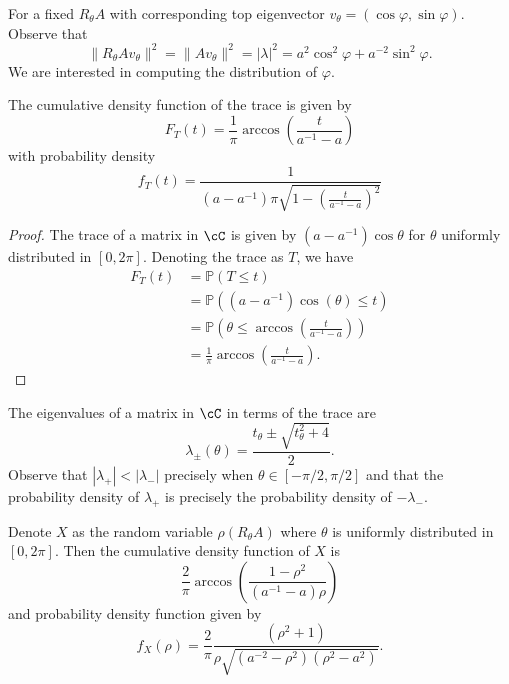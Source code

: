 \documentclass[10pt]{amsart}
\numberwithin{equation}{section}     %
\renewcommand{\P}{\mathbb{P}}
\begin{document}
For a fixed $R_\theta A$ with corresponding top eigenvector $v_\theta =(\cos \varphi, \sin \varphi) $. Observe that $$\|R_\theta A v_\theta\|^2 = \|Av_\theta\|^2= |\lambda|^2 = a^2 \cos^2 \varphi + a^{-2} \sin^2 \varphi. $$  We are interested in computing the distribution of $\varphi$. 

\begin{lemma}
    The cumulative density function of the trace is given by $$F_T(t) =  \frac{1}{\pi } \arccos\left( \frac{t}{a^{-1}-a}\right)$$ with probability density $$f_T(t) =  \frac{1}{(a-a^{-1})\pi\sqrt{1 - \left(\frac{t}{a^{-1}-a}\right)^2}}$$
\end{lemma}

\begin{proof}
    The trace of a matrix in $\cC$ is given by $(a - a^{-1}) \cos \theta$ for $\theta$ uniformly distributed in $[0,2\pi]$. Denoting the trace as $T$, we have \begin{align*}
        F_{T}(t) &= \P(T \leq t) \\
        &= \P((a-a^{-1})\cos(\theta) \leq t) \\
        &= \P\left(\theta \leq \arccos\left( \frac{t}{a^{-1}-a}\right)\right) \\
        &= \frac{1}{\pi } \arccos\left( \frac{t}{a^{-1}-a}\right).
    \end{align*}
\end{proof}

The eigenvalues of a matrix in $\cC$ in terms of the trace are $$\lambda_{\pm}(\theta) = \frac{t_\theta \pm \sqrt{t_\theta^2 + 4}}{2}.$$ Observe that $|\lambda_+| < |\lambda_-|$ precisely when $\theta \in [-\pi/2,\pi/2]$ and that the probability density of $\lambda_+$ is precisely the probability density of $-\lambda_-$. 

\begin{proposition}
    Denote $X$ as the random variable $\rho(R_\theta A)$ where $\theta$ is uniformly distributed in $[0,2\pi]$. Then the cumulative density function of $X$ is $$\frac{2}{\pi} \arccos \left( \frac{1-\rho^2}{(a^{-1} - a) \rho}\right)$$ and probability density function given by $$f_X(\rho) = \frac{2}{\pi} \frac{(\rho^2 + 1)}{\rho \sqrt{(a^{-2}-\rho^2)(\rho^2 - a^2)}}.$$ 
\end{proposition}
\end{document}
